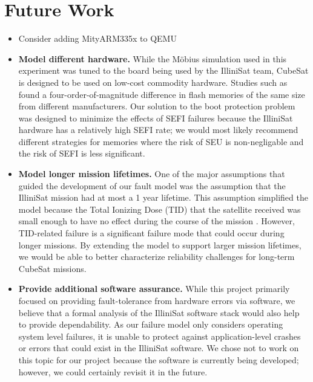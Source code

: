 \section{Future Work}\label{sec:future_work}
\begin{itemize}
  \item Consider adding MityARM335x to QEMU
  \item {\bf Model different hardware.}  While the M\"obius simulation used in this experiment was tuned to the board being used by the IlliniSat team, CubeSat is designed to be used on low-cost commodity hardware.  Studies such as \cite{Oldham2008TID} found a four-order-of-magnitude difference in flash memories of the same size from different manufacturers.  Our solution to the boot protection problem was designed to minimize the effects of SEFI failures because the IlliniSat hardware has a relatively high SEFI rate; we would most likely recommend different strategies for memories where the risk of SEU is non-negligable and the risk of SEFI is less significant.
  \item {\bf Model longer mission lifetimes.}  One of the major assumptions that guided the development of our fault model was the assumption that the IlliniSat mission had at most a 1 year lifetime.  This assumption simplified the model because the Total Ionizing Dose (TID) that the satellite received was small enough to have no effect during the course of the mission \cite{Likar2010Novel, Oldham2008TID}.  However, TID-related failure is a significant failure mode that could occur during longer missions.  By extending the model to support larger mission lifetimes, we would be able to better characterize reliability challenges for long-term CubeSat missions.
  \item {\bf Provide additional software assurance.} While this project primarily focused on providing fault-tolerance from hardware errors via software, we believe that a formal analysis of the IlliniSat software stack would also help to provide dependability.  As our failure model only considers operating system level failures, it is unable to protect against application-level crashes or errors that could exist in the IlliniSat software.  We chose not to work on this topic for our project because the software is currently being developed; however, we could certainly revisit it in the future.
\end{itemize}
